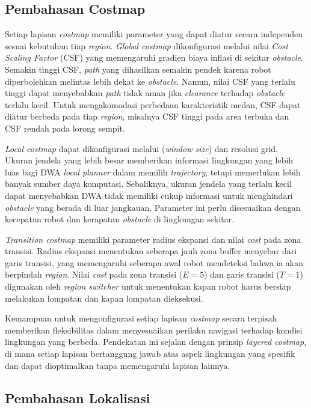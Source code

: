 \subsection{Pembahasan Costmap}

Setiap lapisan \emph{costmap} memiliki parameter yang dapat diatur secara independen sesuai kebutuhan tiap \emph{region}. \emph{Global costmap} dikonfigurasi melalui nilai \emph{Cost Scaling Factor} (CSF) yang memengaruhi gradien biaya inflasi di sekitar \emph{obstacle}. Semakin tinggi CSF, \emph{path} yang dihasilkan semakin pendek karena robot diperbolehkan melintas lebih dekat ke \emph{obstacle}. Namun, nilai CSF yang terlalu tinggi dapat menyebabkan \emph{path} tidak aman jika \emph{clearance} terhadap \emph{obstacle} terlalu kecil. Untuk mengakomodasi perbedaan karakteristik medan, CSF dapat diatur berbeda pada tiap \emph{region}, misalnya CSF tinggi pada area terbuka dan CSF rendah pada lorong sempit.

\emph{Local costmap} dapat dikonfigurasi melalui  (\emph{window size}) dan resolusi grid. Ukuran jendela yang lebih besar memberikan informasi lingkungan yang lebih luas bagi DWA \emph{local planner} dalam memilih \emph{trajectory}, tetapi memerlukan lebih banyak sumber daya komputasi. Sebaliknya, ukuran jendela yang terlalu kecil dapat menyebabkan DWA tidak memiliki cukup informasi untuk menghindari \emph{obstacle} yang berada di luar jangkauan. Parameter ini perlu disesuaikan dengan kecepatan robot dan kerapatan \emph{obstacle} di lingkungan sekitar.

\emph{Transition costmap} memiliki parameter radius ekspansi dan nilai \emph{cost} pada zona transisi. Radius ekspansi menentukan seberapa jauh zona buffer menyebar dari garis transisi, yang memengaruhi seberapa awal robot mendeteksi bahwa ia akan berpindah \emph{region}. Nilai \emph{cost} pada zona transisi ($E = 5$) dan garis transisi ($T = 1$) digunakan oleh \emph{region switcher} untuk menentukan kapan robot harus bersiap melakukan lompatan dan kapan lompatan dieksekusi.

Kemampuan untuk mengonfigurasi setiap lapisan \emph{costmap} secara terpisah memberikan fleksibilitas dalam menyesuaikan perilaku navigasi terhadap kondisi lingkungan yang berbeda. Pendekatan ini sejalan dengan prinsip \emph{layered costmap}, di mana setiap lapisan bertanggung jawab atas aspek lingkungan yang spesifik dan dapat dioptimalkan tanpa memengaruhi lapisan lainnya.

\subsection{Pembahasan Lokalisasi}

